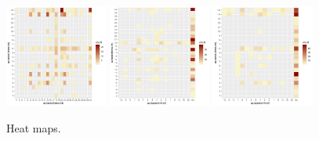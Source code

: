 \documentclass[11pt,letter]{article}
\begin{document}
\begin{figure}[t!]
\centering
\includegraphics[width=0.3\textwidth]{..//..//analyses/limitingcues/figures/heatmapforcexphoto.pdf}
\includegraphics[width=0.3\textwidth]{..//..//analyses/limitingcues/figures/heatmapchillxforce.pdf}
\includegraphics[width=0.3\textwidth]{..//..//analyses/limitingcues/figures/heatmapchillxphoto.pdf}
\caption{Heat maps.}
  \label{fig:heatmaps}
\end{figure}
\end{document}
